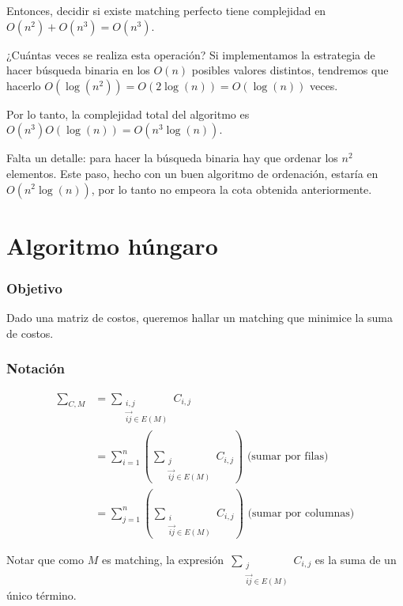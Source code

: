 \documentclass[10pt,a4paper]{article}
\begin{document}
Entonces, decidir si existe matching perfecto tiene complejidad en $O(n^2) + O(n^3) = O(n^3)$.

¿Cuántas veces se realiza esta operación? Si implementamos la estrategia de hacer búsqueda binaria en los $O(n)$ posibles valores distintos, tendremos que hacerlo $O(\log(n^2)) = O(2\log(n)) = O(\log(n))$ veces.

Por lo tanto, la complejidad total del algoritmo es $O(n^3) O (\log(n))= O(n^3\log(n))$.

Falta un detalle: para hacer la búsqueda binaria hay que ordenar los $n^2 $ elementos. Este paso, hecho con un buen algoritmo de ordenación, estaría en $O(n^2\log(n))$, por lo tanto no empeora la cota obtenida anteriormente.

\section*{Algoritmo húngaro}

\subsubsection*{Objetivo}

Dado una matriz de costos, queremos hallar un matching que minimice la suma de costos.

\subsubsection*{Notación}

\begin{center}
\begin{align*} \sum\limits_{C,M} &= \sum\limits_{\substack{i, j\\\overrightarrow{ij} \in E(M)}} C_{i,j} \\ &= \sum\limits_{i = 1}^n \left( \sum\limits_{\substack{j\\ \overrightarrow{ij} \in E(M)}} C_{i,j}\right) \text{ (sumar por filas)}\\ &= \sum\limits_{j = 1}^n \left( \sum\limits_{\substack{i\\ \overrightarrow{ij} \in E(M)}} C_{i,j}\right) \text{ (sumar por columnas)} \end{align*}
\end{center}

Notar que como $M$ es matching, la expresión $\sum\limits_{\substack{j\\ \overrightarrow{ij} \in E(M)}} C_{i,j}$ es la suma de un único término.
\end{document}
